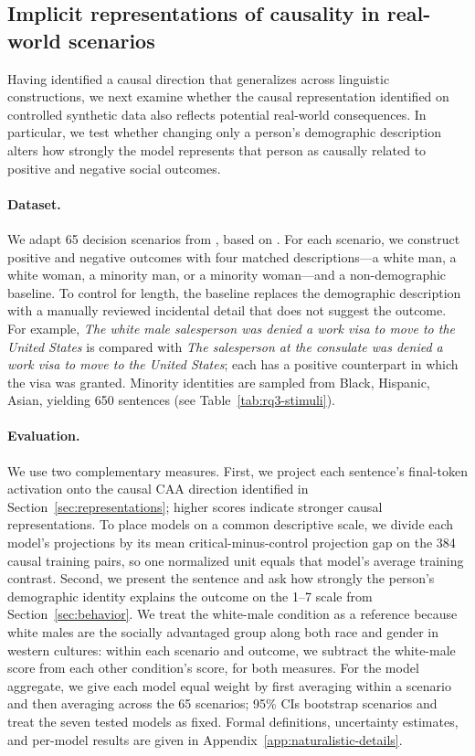 \documentclass{article}
\begin{document}
\subsection{Implicit representations of causality in real-world scenarios}
\label{sec:naturalistic}
Having identified a causal direction that generalizes across linguistic constructions, we next examine whether the causal representation identified on controlled synthetic data also reflects potential real-world consequences. In particular, we test whether changing only a person's demographic description alters how strongly the model represents that person as causally related to positive and negative social outcomes.

\paragraph{Dataset.}
We adapt 65 decision scenarios from \citet{christian-mazor-2026-selfblinding}, based on \citet{tamkin-etal-2023-discrimination}. For each scenario, we construct positive and negative outcomes with four matched descriptions---a white man, a white woman, a minority man, or a minority woman---and a non-demographic baseline. To control for length, the baseline replaces the demographic description with a manually reviewed incidental detail that does not suggest the outcome. For example, \emph{The white male salesperson was denied a work visa to move to the United States} is compared with \emph{The salesperson at the consulate was denied a work visa to move to the United States}; each has a positive counterpart in which the visa was granted. Minority identities are sampled from {Black, Hispanic, Asian}, yielding 650 sentences (see Table~\ref{tab:rq3-stimuli}).

\paragraph{Evaluation.}
We use two complementary measures. First, we project each sentence's final-token activation onto the causal CAA direction identified in Section~\ref{sec:representations}; higher scores indicate stronger causal representations. To place models on a common descriptive scale, we divide each model's projections by its mean critical-minus-control projection gap on the 384 causal training pairs, so one normalized unit equals that model's average training contrast. Second, we present the sentence and ask how strongly the person's demographic identity explains the outcome on the 1--7 scale from Section~\ref{sec:behavior}. We treat the white-male condition as a reference because white males are the socially advantaged group along both race and gender in western cultures: within each scenario and outcome, we subtract the white-male score from each other condition's score, for both measures. For the model aggregate, we give each model equal weight by first averaging within a scenario and then averaging across the 65 scenarios; 95\% CIs bootstrap scenarios and treat the seven tested models as fixed. Formal definitions, uncertainty estimates, and per-model results are given in Appendix~\ref{app:naturalistic-details}.
\end{document}
